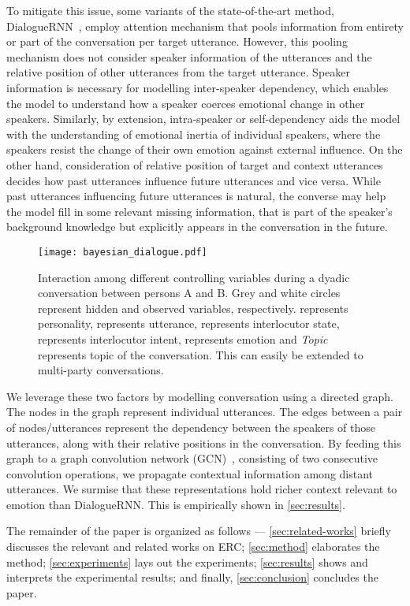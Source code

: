 \documentclass[11pt,a4paper]{article}
\begin{document}
To mitigate this issue, some variants of the state-of-the-art method, DialogueRNN~\cite{dialoguernn}, employ attention mechanism that pools information from entirety or part of the conversation per target utterance. However, this pooling mechanism does not consider speaker information of the utterances and the relative position of other utterances from the target utterance. Speaker information is necessary for modelling inter-speaker dependency, which enables the model to understand how a speaker coerces emotional change in other speakers. Similarly, by extension, intra-speaker or self-dependency aids the model with the understanding of emotional inertia of individual speakers, where the speakers resist the change of their own emotion against external influence. On the other hand, consideration of relative position of target and context utterances decides how past utterances influence future utterances and vice versa. While past utterances influencing future utterances is natural, the converse may help the model fill in some relevant missing information, that is part of the speaker's background knowledge but explicitly appears in the conversation in the future.
\begin{figure}[t]
    \centering
    \texttt{[image: bayesian\_dialogue.pdf]}
    \caption{Interaction among different controlling variables during a dyadic conversation between persons A and B. Grey and white circles represent hidden and observed variables, respectively.  represents personality,  represents utterance,  represents interlocutor state,  represents interlocutor intent,  represents emotion and \emph{Topic} represents topic of the conversation. This can easily be extended to multi-party conversations.}
    \label{fig:intent-modelling}
\end{figure}
We leverage these two factors by modelling conversation using a directed graph. The nodes in the graph represent individual utterances. The edges between a pair of nodes/utterances represent the dependency between the speakers of those utterances, along with their relative positions in the conversation. By feeding this graph to a graph convolution network (GCN)~\cite{NIPS2016_6081}, consisting of two consecutive convolution operations, we propagate contextual information among distant utterances. We surmise that these representations hold richer context relevant to emotion than DialogueRNN. This is empirically shown in \cref{sec:results}.

The remainder of the paper is organized as follows --- \cref{sec:related-works} briefly discusses the relevant and related works on ERC; \cref{sec:method} elaborates the method; \cref{sec:experiments} lays out the experiments; \cref{sec:results} shows and interprets the experimental results; and finally, \cref{sec:conclusion} concludes the paper.
\end{document}
